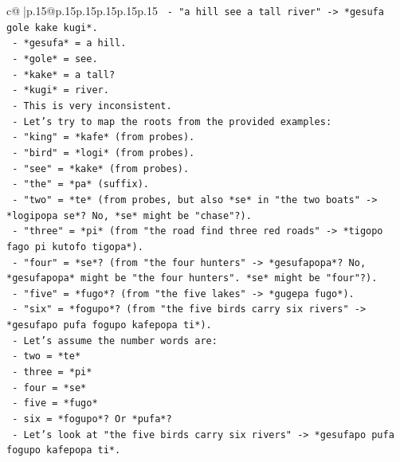 \documentclass{article}
\begin{document}
{\begin{supertabular}{c@{$\;$}|p{.15\linewidth}@{}p{.15\linewidth}p{.15\linewidth}p{.15\linewidth}p{.15\linewidth}p{.15\linewidth}}
{{{\texttt{            {-} "a hill see a tall river" {-}> *gesufa gole kake kugi*.} \\
\texttt{              {-} *gesufa* = a hill.} \\
\texttt{              {-} *gole* = see.} \\
\texttt{              {-} *kake* = a tall?} \\
\texttt{              {-} *kugi* = river.} \\
\texttt{            {-} This is very inconsistent.} \\
\texttt{            {-} Let's try to map the roots from the provided examples:} \\
\texttt{              {-} "king" = *kafe* (from probes).} \\
\texttt{              {-} "bird" = *logi* (from probes).} \\
\texttt{              {-} "see" = *kake* (from probes).} \\
\texttt{              {-} "the" = *pa* (suffix).} \\
\texttt{              {-} "two" = *te* (from probes, but also *se* in "the two boats" {-}> *logipopa se*? No, *se* might be "chase"?).} \\
\texttt{              {-} "three" = *pi* (from "the road find three red roads" {-}> *tigopo fago pi kutofo tigopa*).} \\
\texttt{              {-} "four" = *se*? (from "the four hunters" {-}> *gesufapopa*? No, *gesufapopa* might be "the four hunters". *se* might be "four"?).} \\
\texttt{              {-} "five" = *fugo*? (from "the five lakes" {-}> *gugepa fugo*).} \\
\texttt{              {-} "six" = *fogupo*? (from "the five birds carry six rivers" {-}> *gesufapo pufa fogupo kafepopa ti*).} \\
\texttt{            {-} Let's assume the number words are:} \\
\texttt{              {-} two = *te*} \\
\texttt{              {-} three = *pi*} \\
\texttt{              {-} four = *se*} \\
\texttt{              {-} five = *fugo*} \\
\texttt{              {-} six = *fogupo*? Or *pufa*?} \\
\texttt{            {-} Let's look at "the five birds carry six rivers" {-}> *gesufapo pufa fogupo kafepopa ti*.} \\
}}}
\end{supertabular}}
\end{document}
